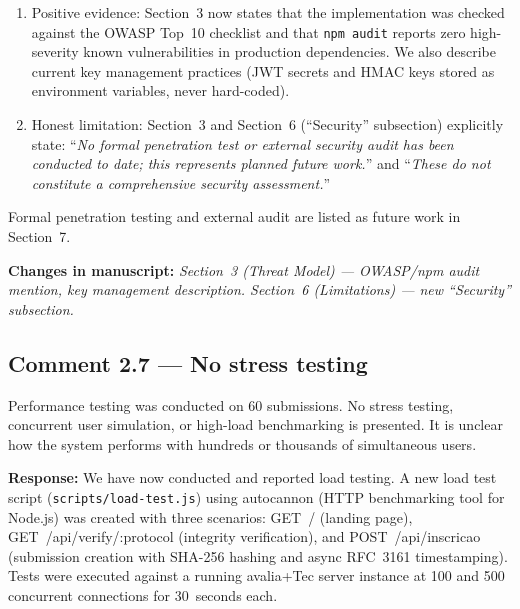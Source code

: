 \documentclass[11pt,a4paper]{article}
\newcommand{\response}[1]{\par\noindent\textcolor{responsecolor}{\textbf{Response:}} #1}
\newcommand{\change}[1]{\par\noindent\textcolor{changecolor}{\textbf{Changes in manuscript:}} \textit{#1}}
\begin{document}
\begin{enumerate}[nosep]
  \item Positive evidence: Section~3 now states that the implementation was checked against the OWASP Top~10 checklist and that \texttt{npm audit} reports zero high-severity known vulnerabilities in production dependencies. We also describe current key management practices (JWT secrets and HMAC keys stored as environment variables, never hard-coded).
  \item Honest limitation: Section~3 and Section~6 (``Security'' subsection) explicitly state: ``\textit{No formal penetration test or external security audit has been conducted to date; this represents planned future work.}'' and ``\textit{These do not constitute a comprehensive security assessment.}''
\end{enumerate}

Formal penetration testing and external audit are listed as future work in Section~7.

\change{Section~3 (Threat Model) --- OWASP/npm audit mention, key management description. Section~6 (Limitations) --- new ``Security'' subsection.}

\bigskip

\subsection*{Comment 2.7 --- No stress testing}

\begin{reviewerbox}
Performance testing was conducted on 60 submissions. No stress testing, concurrent user simulation, or high-load benchmarking is presented. It is unclear how the system performs with hundreds or thousands of simultaneous users.
\end{reviewerbox}

\response{We have now conducted and reported load testing. A new load test script (\texttt{scripts/load-test.js}) using autocannon (HTTP benchmarking tool for Node.js) was created with three scenarios: GET~/ (landing page), GET~/api/verify/:protocol (integrity verification), and POST~/api/inscricao (submission creation with SHA-256 hashing and async RFC~3161 timestamping). Tests were executed against a running avalia+Tec server instance at 100 and 500 concurrent connections for 30~seconds each.}
\end{document}
